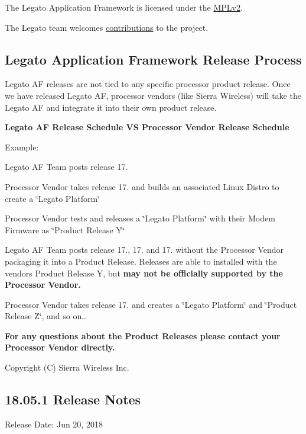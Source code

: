 The Legato Application Framework is licensed under the \hyperlink{aboutLicenses}{M\+P\+Lv2}.

The Legato team welcomes \hyperlink{aboutLegatoContributing}{contributions} to the project.\hypertarget{aboutReleaseInfo_releaseInfo_LegatoAFReleases}{}\subsection{Legato Application Framework Release Process}\label{aboutReleaseInfo_releaseInfo_LegatoAFReleases}
Legato AF releases are not tied to any specific processor product release. Once we have released Legato AF, processor vendors (like Sierra Wireless) will take the Legato AF and integrate it into their own product release.

{\bfseries  Legato AF Release Schedule VS Processor Vendor Release Schedule }



Example\+:
\begin{DoxyItemize}
\item Legato AF Team posts release 17.
\item Processor Vendor takes release 17. and builds an associated Linux Distro to create a \char`\"{}\+Legato
   Platform\char`\"{}
\item Processor Vendor tests and releases a \char`\"{}\+Legato Platform\char`\"{} with their Modem Firmware as \char`\"{}\+Product
   Release Y\char`\"{}
\item Legato AF Team posts release 17., 17. and 17. without the Processor Vendor packaging it into a Product Release. Releases are able to installed with the vendor\textquotesingle{}s Product Release Y, but {\bfseries  may not be officially supported by the Processor Vendor. }
\item Processor Vendor takes release 17. and creates a \char`\"{}\+Legato Platform\char`\"{} and \char`\"{}\+Product Release Z\char`\"{}, and so on..
\end{DoxyItemize}

{\bfseries For any questions about the Product Releases please contact your Processor Vendor directly.}

Copyright (C) Sierra Wireless Inc. \hypertarget{releaseNotes18051}{}\subsection{18.05.1 Release Notes}\label{releaseNotes18051}
Release Date\+: Jun 20, 2018

